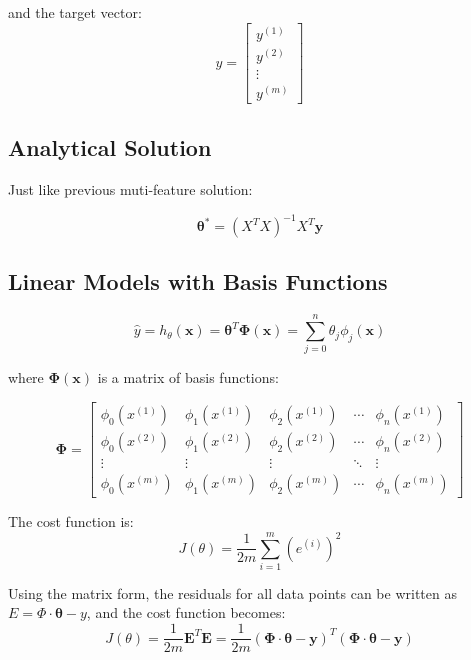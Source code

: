 and the target vector:
\begin{equation}
y =
\begin{bmatrix}
y^{(1)} \\
y^{(2)} \\
\vdots \\
y^{(m)}
\end{bmatrix}
\end{equation}


\subsection{Analytical Solution}

Just like previous muti-feature solution:

\begin{equation}
\boldsymbol{\theta}^* = (X^T X)^{-1}X^T \mathbf{y}
\end{equation}

\subsection{Linear Models with Basis Functions}
\begin{equation}
    \hat{y} = h_{\theta}(\mathbf{x}) = \boldsymbol{\theta}^T \boldsymbol{\Phi}(\mathbf{x})
    = \sum_{j=0}^{n} \theta_j \phi_j(\mathbf{x})
\end{equation}

where $\boldsymbol{\Phi}(\mathbf{x})$ is a matrix of basis functions:

\begin{equation}
    \boldsymbol{\Phi} =
\begin{bmatrix}
\phi_0(x^{(1)}) & \phi_1(x^{(1)}) & \phi_2(x^{(1)}) & \cdots & \phi_n(x^{(1)}) \\
\phi_0(x^{(2)}) & \phi_1(x^{(2)}) & \phi_2(x^{(2)}) & \cdots & \phi_n(x^{(2)}) \\
\vdots & \vdots & \vdots & \ddots & \vdots \\
\phi_0(x^{(m)}) & \phi_1(x^{(m)}) & \phi_2(x^{(m)}) & \cdots & \phi_n(x^{(m)})
\end{bmatrix}
\end{equation}

The cost function is:
\[
    J(\theta) = \frac{1}{2m} \sum_{i=1}^m \left( e^{(i)} \right)^2
\]

Using the matrix form, the residuals for all data points can be written as \(E = \Phi \cdot \boldsymbol{\theta} - y\), and the cost function becomes:
\[
J(\theta) = \frac{1}{2m} \mathbf{E}^T \mathbf{E} = \frac{1}{2m} (\boldsymbol{\Phi} \cdot \boldsymbol{\theta} - \mathbf{y})^T
(\boldsymbol{\Phi} \cdot \boldsymbol{\theta} - \mathbf{y})
\]

